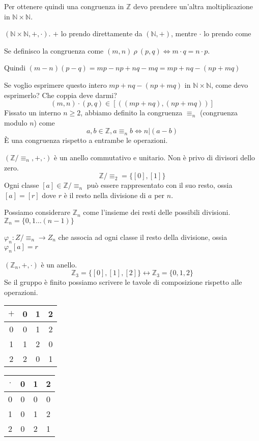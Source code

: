 Per ottenere quindi una congruenza in $\mathbb{Z}$ devo prendere un'altra moltiplicazione in $\mathbb{N} \times \mathbb{N}$.

$(\mathbb{N} \times \mathbb{N}, +, \cdot)$. $+$ lo prendo direttamente da $(\mathbb{N}, +)$, mentre $\cdot$ lo prendo come

Se definisco la congruenza come $(m, n) \ \rho \ (p, q) \Leftrightarrow m \cdot q = n \cdot p$.

Quindi $(m - n) (p - q) = m p - n p + n q - m q = m p + n q - ( n p + m q)$

Se voglio esprimere questo intero $m p + n q - ( n p + m q)$ in $\mathbb{N} \times \mathbb{N}$, come devo esprimerlo? Che coppia deve darmi?
\[
(m, n) \cdot (p, q) \in [((m p + n q), (n p + m q))]
\]
Fissato un interno $n \ge 2$, abbiamo definito la congruenza $\equiv_n$ (congruenza modulo $n$) come
\[
a, b \in \mathbb{Z}, a \equiv_n b \Leftrightarrow n | (a - b)
\]
\`E una congruenza rispetto a entrambe le operazioni.

$(\mathbb{Z} / \equiv_n, +, \cdot)$ \`e un anello commutativo e unitario. Non \`e privo di divisori dello zero.
\[
\mathbb{Z} / \equiv_2 = \{ [0], [1] \}
\]
Ogni classe $[a] \in \mathbb{Z} / \equiv_n$ pu\`o essere rappresentato con il suo resto, ossia $[a] = [r]$ dove $r$ \`e il resto nella divisione di $a$ per $n$.

Possiamo considerare $\mathbb{Z}_n$ come l'insieme dei resti delle possibili divisioni. $\mathbb{Z}_n = \{ 0, 1 \dots (n-1)\}$

$\varphi_n : Z / \equiv_n \to Z_n$ che associa ad ogni classe il resto della divisione, ossia $\varphi_n [a] = r$

$(\mathbb{Z}_n, +, \cdot )$ \`e un anello.
\[
\mathbb{Z}_3 = \{ [0], [1], [2] \} \leftrightarrow \mathbb{Z}_3 = \{ 0, 1, 2 \}
\]
Se il gruppo \`e finito possiamo scrivere le tavole di composizione rispetto alle operazioni.

\begin{tabular}{c|ccc}
$+$ & 0 & 1 & 2 \\
\hline
0 & 0 & 1 & 2 \\
1 & 1 & 2 & 0 \\
2 & 2 & 0 & 1
\end{tabular}

\begin{tabular}{c|ccc}
$\cdot$ & 0 & 1 & 2 \\
\hline
0 & 0 & 0 & 0 \\
1 & 0 & 1 & 2 \\
2 & 0 & 2 & 1
\end{tabular}

